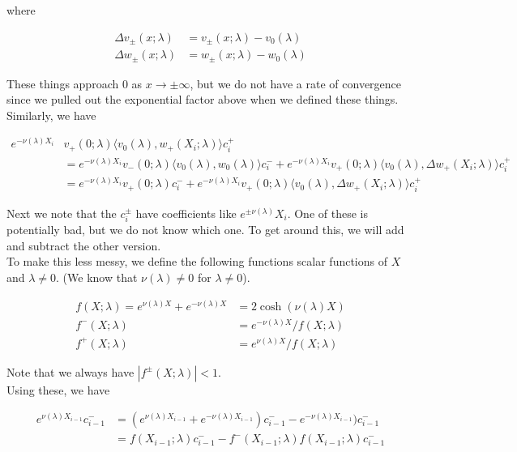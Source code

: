 \documentclass[12pt]{article}
\begin{document}
\begin{enumerate}
where 

\begin{align*}
\Delta v_\pm(x; \lambda) &= v_\pm(x; \lambda) - v_0(\lambda) \\
\Delta w_\pm(x; \lambda) &= w_\pm(x; \lambda) - w_0(\lambda)
\end{align*}

These things approach 0 as $x \rightarrow \pm \infty$, but we do not have a rate of convergence since we pulled out the exponential factor above when we defined these things.\\

Similarly, we have

\begin{align*}
e^{-\nu(\lambda)X_i} &v_+(0; \lambda) \langle v_0(\lambda), w_+(X_i; \lambda) \rangle c_i^+ \\
&= e^{-\nu(\lambda)X_i} v_-(0; \lambda) \langle v_0(\lambda), w_0(\lambda) \rangle c_i^- + e^{-\nu(\lambda)X_i} v_+(0; \lambda) \langle v_0(\lambda), \Delta w_+(X_i; \lambda) \rangle c_i^+ \\
&= e^{-\nu(\lambda)X_i} v_+(0; \lambda) c_i^- + e^{-\nu(\lambda)X_i} v_+(0; \lambda) \langle v_0(\lambda), \Delta w_+(X_i; \lambda) \rangle c_i^+
\end{align*}

Next we note that the $c_i^\pm$ have coefficients like $e^{\pm \nu(\lambda) }X_i$. One of these is potentially bad, but we do not know which one. To get around this, we will add and subtract the other version. \\

To make this less messy, we define the following functions scalar functions of $X$ and $\lambda \neq 0$. (We know that $\nu(\lambda) \neq 0$ for $\lambda \neq 0$).

\begin{align*}
f(X; \lambda) = e^{\nu(\lambda)X} + e^{-\nu(\lambda)X} &= 2 \cosh (\nu(\lambda) X) \\
f^-(X; \lambda) &= e^{-\nu(\lambda)X} / f(X; \lambda) \\
f^+(X; \lambda) &= e^{\nu(\lambda)X} / f(X; \lambda)
\end{align*}

Note that we always have $|f^\pm(X; \lambda)| < 1$.\\

Using these, we have

\begin{align*}
e^{\nu(\lambda)X_{i-1}} c_{i-1}^- &= (e^{\nu(\lambda)X_{i-1}} + e^{-\nu(\lambda)X_{i-1}})c_{i-1}^- - e^{-\nu(\lambda)X_{i-1}})c_{i-1}^- \\
&= f(X_{i-1}; \lambda) c_{i-1}^- - f^-(X_{i-1}; \lambda)f(X_{i-1}; \lambda) c_{i-1}^-
\end{align*}


\end{enumerate}
\end{document}
